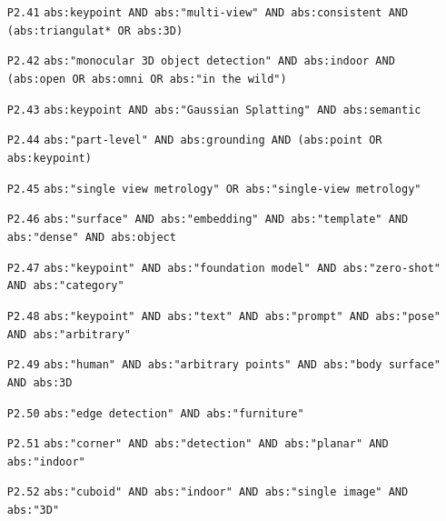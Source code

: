 {\begin{itemize}
\item[\texttt{P2.41}] \texttt{abs:keypoint AND abs:"multi-view" AND abs:consistent AND (abs:triangulat* OR abs:3D)}
\item[\texttt{P2.42}] \texttt{abs:"monocular 3D object detection" AND abs:indoor AND (abs:open OR abs:omni OR abs:"in the wild")}
\item[\texttt{P2.43}] \texttt{abs:keypoint AND abs:"Gaussian Splatting" AND abs:semantic}
\item[\texttt{P2.44}] \texttt{abs:"part-level" AND abs:grounding AND (abs:point OR abs:keypoint)}
\item[\texttt{P2.45}] \texttt{abs:"single view metrology" OR abs:"single-view metrology"}
\item[\texttt{P2.46}] \texttt{abs:"surface" AND abs:"embedding" AND abs:"template" AND abs:"dense" AND abs:object}
\item[\texttt{P2.47}] \texttt{abs:"keypoint" AND abs:"foundation model" AND abs:"zero-shot" AND abs:"category"}
\item[\texttt{P2.48}] \texttt{abs:"keypoint" AND abs:"text" AND abs:"prompt" AND abs:"pose" AND abs:"arbitrary"}
\item[\texttt{P2.49}] \texttt{abs:"human" AND abs:"arbitrary points" AND abs:"body surface" AND abs:3D}
\item[\texttt{P2.50}] \texttt{abs:"edge detection" AND abs:"furniture"}
\item[\texttt{P2.51}] \texttt{abs:"corner" AND abs:"detection" AND abs:"planar" AND abs:"indoor"}
\item[\texttt{P2.52}] \texttt{abs:"cuboid" AND abs:"indoor" AND abs:"single image" AND abs:"3D"}
\end{itemize}}

